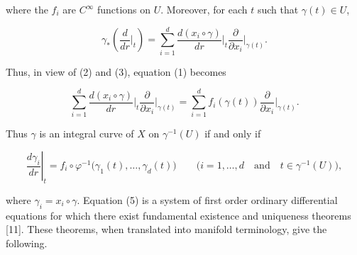 where the $f_{i}$ are $C^{\infty}$ functions on $U$. Moreover, for each $t$ such that $\gamma(t) \in U$,

\begin{equation}
	\tag{3}\label{eq:1.47:3}
	\gamma_{*}\left(\frac{d}{d r}\bigg\vert_{t}\right)=\sum_{i=1}^{d}\frac{d(x_{i}\circ\gamma)}{d r}\bigg\vert_{t}\frac{\partial}{\partial x_{i}}\bigg\vert_{\gamma(t)}.
\end{equation}

Thus, in view of (2) and (3), equation (1) becomes

\begin{equation}
	\tag{4}\label{eq:1.47:4}
	\sum_{i=1}^{d}\frac{d(x_{i}\circ\gamma)}{d r}\bigg|_{t}\frac{\partial}{\partial x_{i}}\bigg|_{\gamma(t)}=\sum_{i=1}^{d}f_{i}(\gamma(t))\frac{\partial}{\partial x_{i}}\bigg|_{\gamma(t)}.
\end{equation}

Thus $\gamma$ is an integral curve of $X$ on $\gamma^{-1}(U)$ if and only if

\[
	\left.\frac{d\gamma_{i}}{d r}\right|_{t}=f_{i}\circ\varphi^{-1}\big(\gamma_{1}(t),\ldots,\gamma_{d}(t)\big)\qquad\big(i=1,\ldots,d\quad\mathrm{and}\quad t\in\gamma^{-1}(U)\big),
\]

where $\gamma_{i}=x_{i}\circ\gamma$. Equation (5) is a system of first order ordinary differential equations for which there exist fundamental existence and uniqueness theorems [11]. These theorems, when translated into manifold terminology, give the following.

